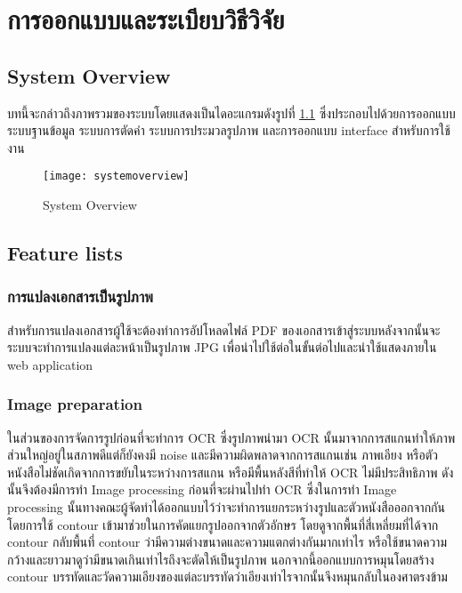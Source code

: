 \chapter{การออกแบบและระเบียบวิธีวิจัย}

\section{System Overview}

บทนี้จะกล่าวถึงภาพรวมของระบบโดยแสดงเป็นไดอะแกรมดังรูปที่ \ref{fig:systemoverview} ซึ่งประกอบไปด้วยการออกแบบระบบฐานข้อมูล ระบบการตัดคำ ระบบการประมวลรูปภาพ และการออกแบบ interface สำหรับการใช้งาน

\begin{figure}[H]
    \centering
    \texttt{[image: systemoverview]}
    \caption{System Overview}\label{fig:systemoverview}
\end{figure}

\section{Feature lists}
\subsection{การแปลงเอกสารเป็นรูปภาพ}

สำหรับการแปลงเอกสารผู้ใช้จะต้องทำการอัปโหลดไฟล์ PDF ของเอกสารเข้าสู่ระบบหลังจากนั้นจะระบบจะทำการแปลงแต่ละหน้าเป็นรูปภาพ JPG เพื่อนำไปใช้ต่อในขั้นต่อไปและนำใช้แสดงภายใน web application

\subsection{Image preparation}

ในส่วนของการจัดการรูปก่อนที่จะทำการ OCR ซึ่งรูปภาพนำมา OCR นั้นมาจากการสแกนทำให้ภาพส่วนใหญ่อยู่ในสภาพดีแต่ก็ยังคงมี noise  และมีความผิดพลาดจากการสแกนเช่น ภาพเอียง หรือตัวหนังสือไม่ชัดเกิดจากการขยับในระหว่างการสแกน หรือมีพื้นหลังสีที่ทำให้ OCR ไม่มีประสิทธิภาพ ดังนั้นจึงต้องมีการทำ Image processing ก่อนที่จะผ่านไปทำ OCR
ซึ่งในการทำ Image processing นั้นทางคณะผู้จัดทำได้ออกแบบไว้ว่าจะทำการแยกระหว่างรูปและตัวหนังสือออกจากกัน โดยการใช้ contour เข้ามาช่วยในการคัดแยกรูปออกจากตัวอักษร โดยดูจากพื้นที่สี่เหลี่ยมที่ได้จาก contour กลับพื้นที่ contour ว่ามีความต่างขนาดและความแตกต่างกันมากเท่าไร หรือใช้ขนาดความกว้างและยาวมาดูว่ามีขนาดเกินเท่าไรถึงจะตัดให้เป็นรูปภาพ
นอกจากนี้ออกแบบการหมุนโดยสร้าง contour บรรทัดและวัดความเอียงของแต่ละบรรทัดว่าเอียงเท่าไรจากนั้นจึงหมุนกลับในองศาตรงข้าม

